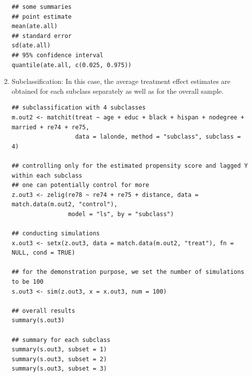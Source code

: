 \documentclass[oneside,letterpaper,titlepage]{article}
\begin{document}
\begin{enumerate}
\begin{verbatim}
## some summaries
## point estimate
mean(ate.all)
## standard error
sd(ate.all)
## 95% confidence interval
quantile(ate.all, c(0.025, 0.975))
\end{verbatim}
  
\item Subclassification: In this case, the average treatment effect
  estimates are obtained for each subclass separately as well as
  for the overall sample.

\begin{verbatim}
## subclassification with 4 subclasses
m.out2 <- matchit(treat ~ age + educ + black + hispan + nodegree + married + re74 + re75,  
                  data = lalonde, method = "subclass", subclass = 4)

## controlling only for the estimated propensity score and lagged Y within each subclass
## one can potentially control for more
z.out3 <- zelig(re78 ~ re74 + re75 + distance, data = match.data(m.out2, "control"), 
                model = "ls", by = "subclass")

## conducting simulations
x.out3 <- setx(z.out3, data = match.data(m.out2, "treat"), fn = NULL, cond = TRUE)

## for the demonstration purpose, we set the number of simulations to be 100
s.out3 <- sim(z.out3, x = x.out3, num = 100)

## overall results
summary(s.out3) 

## summary for each subclass
summary(s.out3, subset = 1) 
summary(s.out3, subset = 2) 
summary(s.out3, subset = 3) 
\end{verbatim}
  
%
\end{enumerate}
\end{document}
